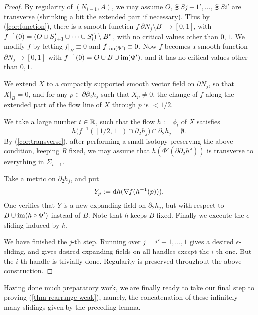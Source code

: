 \begin{proof}
    By regularity of $(N_{i-1},A)$,
    we may assume $O,\subsup S{j+1}\prime,\dotsc,\subsup Si\prime$ are transverse
    (shrinking a bit the extended part if necessary).
    Thus by (\ref{cor:function}),
    there is a smooth function $f\:\partial N_j\setminus B^\circ\to[0,1]$,
    with $f^{\smash{-1}}(0)=(O\cup S_{\smash{j+1}}^{\prime}\cup\cdots\cup S_{\smash{i}}^{\prime})\setminus B^\circ$,
    with no critical values other than $0,1$.
    We modify $f$ by letting $f|_B\equiv0$ and $f|_{\operatorname{im}(\Phi')}\equiv0$.
    Now $f$ becomes a smooth function $\partial N_j\to[0,1]$ with $f^{-1}(0)=O\cup B\cup\operatorname{im}(\Phi')$,
    and it has no critical values other than $0,1$.

    We extend $X$ to a compactly supported smooth vector field on $\partial N_j$,
    so that $X|_{B}=0$, and for any $p\in\partial\partial_2h_j$ such that $X_p\neq0$,
    the change of $f$ along the extended part of the flow line of $X$ through $p$ is $<1/2$.
    
    We take a large number $t\in\mathbb{R}$,
    such that the flow $h:=\phi_t$ of $X$ satisfies
    \[h\bigl(f^{-1}([1/2,1])\cap\partial_2h_j\bigr)\cap\partial_2h_j=\emptyset.\]
    By (\ref{cor:transverse}), after performing a small isotopy
    preserving the above condition, keeping $B$ fixed,
    we may assume that $h(\Phi'(\partial\partial_2h^\lambda))$ is transverse to
    everything in $\Sigma_{i-1}$.
    
    Take a metric on $\partial_2h_j$, and put
    \[ Y_p:=\mathrm{d} h(\nabla f(h^{-1}(p))). \]
    One verifies that $Y$ is a new expanding field on $\partial_2h_j$, 
    but with respect to $B\cup\operatorname{im}(h\circ\Phi')$ instead of $B$.
    Note that $h$ keeps $B$ fixed.
    Finally we execute the $\epsilon$-sliding induced by $h$.
    
    We have finished the $j$-th step.
    Running over $j=i'-1,\dotsc,1$ gives a desired $\epsilon$-sliding,
    and gives desired expanding fields on all handles except the $i$-th one.
    But the $i$-th handle is trivially done.
    Regularity is preserved throughout the above construction.
\end{proof}

Having done much preparatory work,
we are finally ready to take our final step to proving (\ref{thm-rearrange-weak}),
namely, the concatenation of these infinitely many slidings
given by the preceding lemma.

